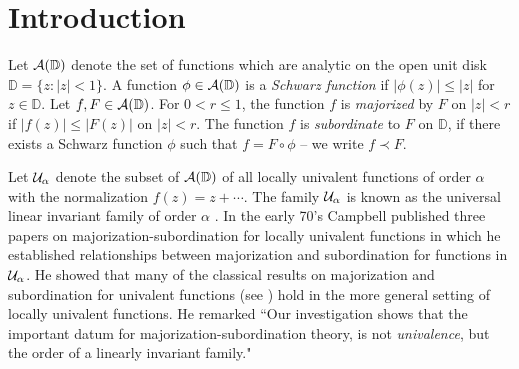\documentclass[12pt]{article}
\author{Roger W. Barnard \and Kent Pearce}
\date{3 November 2008}
\newcommand{\cA}{{\cal{A}}}
\newcommand{\cU}{{\cal{U}}}
\newcommand{\D}{{\mathbb D}}
\begin{document}
\maketitle
\begin{abstract}
In the early 70's, D.M. Campbell published three papers on majorization-\linebreak subordination results for locally univalent functions.  
In particular, he showed that if $F$ is linearly invariant of order $\alpha$ and if $f$ is subordinate to $F$ on 
$\{z : |z| < 1\}$, then $f'$ is majorized by $F'$ on $\{ z : |z| < m(\alpha) \}$ where 
$m(\alpha) = \alpha +1 - \sqrt{\alpha^2+2\alpha}$, provided $\alpha \ge 1.65.$  He conjectured, 
in fact, that this result also held for $1.65 > \alpha \ge 1$.  We review Campbell's proof 
and why the restriction $\alpha \ge 1.65$ arose in the proof.  We then affirmatively verify Campbell's conjecture in Theorem 1.

\vspace{0.4in}

\noindent Key words: majorization, subordination, locally univalent, Campbell \\
\noindent AMS Subject Classification 2000: 30C70

\end{abstract}

\section{Introduction}

Let $\cA(\D)$ denote the set of functions which are analytic on the open
unit disk $\D = \{z : |z| < 1\}$.  A function $\phi \in \cA(\D)$
is a \emph{Schwarz function} if $|\phi(z)| \le |z|$ for $z \in \D$.  
Let $f, F \in \cA(\D)$.  For $0 < r \le 1$, the function $f$ is \emph{majorized} 
by $F$ on $|z| < r$ if $|f(z)| \le |F(z)|$ on $|z| < r$.  The function 
$f$ is \emph{subordinate} to $F$ on $\D$, if there 
exists a Schwarz function $\phi$ such that  $f = F \circ \phi$ -- we write $f \prec F$.

Let $\cU_\alpha$ denote the subset of $\cA(\D)$ of all locally univalent
functions of order $\alpha$ with the normalization $f(z) = z+ \cdots$.
The family $\cU_\alpha$ is known as the universal linear invariant family of 
order $\alpha$ \cite{Pom01}.  In the early 70's Campbell published three papers 
on majorization-subordination for locally univalent functions \cite{DMC01,DMC02,DMC03}
in which he established relationships between majorization and subordination for functions
in $\cU_\alpha$.  He showed that many of the classical results on 
majorization and subordination for univalent functions (see \cite{McG,TS}) hold in the more general setting 
of locally univalent functions.  He remarked ``Our investigation shows that 
the important datum for majorization-subordination theory, is not 
\emph{univalence}, but the order of a linearly invariant family."
\end{document}
